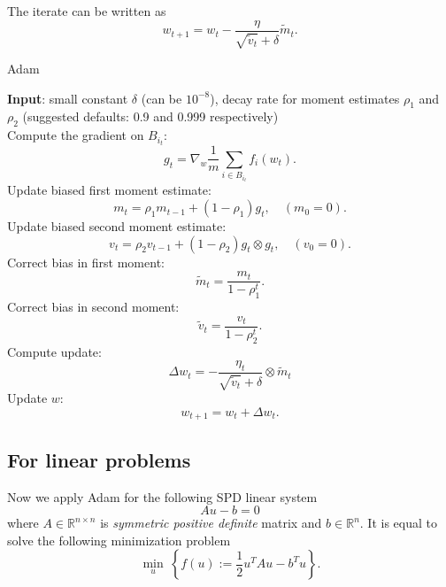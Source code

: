 The iterate can be written as 
\begin{equation}\label{Adam}
w_{t+1}=w_t-\frac{\eta}{\sqrt{\tilde{v}_t}+\delta} \tilde{m}_t.
\end{equation}


\begin{algorithm}[H]
\caption{Adam}
\label{alg:Adam}
{\bf Input}: small constant $\delta$ (can be $10^{-8}$), decay rate for moment estimates $\rho_1$ and $\rho_2$ (suggested defaults: 0.9 and 0.999 respectively)\\
Compute the gradient on $B_{i_t}$:
\begin{equation}
g_t = \nabla_{w} \frac{1}{m} \sum_{i \in B_{i_t}} f_i(w_{t}).
\end{equation}
Update biased first moment estimate:
\begin{equation}
m_t = \rho_1 m_{t-1} + (1-\rho_1)g_t, \quad (m_0 = 0).
\end{equation}
Update biased second moment estimate:
\begin{equation}
v_t = \rho_2 v_{t-1} + (1-\rho_2)g_t \otimes g_t, \quad (v_0 = 0).
\end{equation}
Correct bias in first moment:
\begin{equation}
\tilde m_t = \frac{m_t}{1 - \rho_1^{t}}.
\end{equation}
Correct bias in second moment:
\begin{equation}
\tilde v_t = \frac{v_t}{1 - \rho_2^{t}}.
\end{equation}
Compute update:
\begin{equation}
\Delta w_t =  -\frac{\eta_t}{\sqrt{\tilde v_t} + \delta} \otimes \tilde m_t
\end{equation}
Update $w$:
\begin{equation}
w_{t+1} = w_t + \Delta w_t.
\end{equation}
\end{algorithm}

\subsection{For linear problems}
Now we apply Adam for the following SPD linear system
\begin{equation}
	A u-b=0
\end{equation}
where $A \in \mathbb{R}^{n \times n}$ is \emph{symmetric positive definite} matrix and $b \in \mathbb{R}^n$.
It is equal to solve the following minimization problem
\begin{equation}
	\min_u\ \left\{f(u):= \frac{1}{2} u^T Au - b^T u\right\}.
\end{equation}

